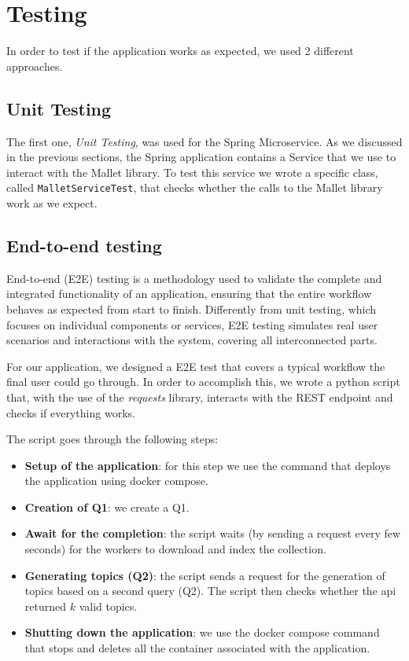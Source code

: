 \section{Testing}
\label{ch:testing}
In order to test if the application works as expected, we used 2 different
approaches.

\subsection{Unit Testing}
The first one, \textit{Unit Testing}, was used for the Spring Microservice.
As we discussed in the previous sections, the Spring application contains
a Service that we use to interact with the Mallet library. To test this service
we wrote a specific class, called \texttt{MalletServiceTest}, that checks whether
the calls to the Mallet library work as we expect.

\subsection{End-to-end testing}
End-to-end (E2E) testing is a methodology used to validate the complete and
integrated functionality of an application, ensuring that the entire workflow
behaves as expected from start to finish.
Differently from unit testing, which focuses on individual components or
services, E2E testing simulates real user scenarios and interactions with the
system, covering all interconnected parts.

For our application, we designed a E2E test that covers a typical workflow
the final user could go through.
In order to accomplish this, we wrote a python script that, with the use of
the \textit{requests} library, interacts with the REST endpoint and checks
if everything works.

The script goes through the following steps:
\begin{itemize}
        \item \textbf{Setup of the application}: for this step we use the
                command that deploys the application using docker compose.
        \item \textbf{Creation of Q1}: we create a Q1.
        \item \textbf{Await for the completion}: the script waits (by sending
                a request every few seconds) for the workers to download and
                index the collection.
        \item \textbf{Generating topics (Q2)}: the script sends a request for
                the generation of topics based on a second query (Q2). The script
                then checks whether the api returned $k$ valid topics.
        \item \textbf{Shutting down the application}: we use the docker
                compose command that stops and deletes all the container associated
                with the application.
\end{itemize}
